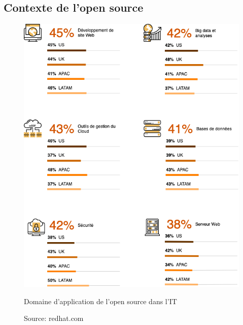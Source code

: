 \begin{appendices}
\chapter{Contexte de l'open source}

\begin{figure}[h]
	\center
	\includegraphics[scale=0.65]{./img/Domain_os.png}
	\caption{Domaine d'application de l'open source dans l'IT}							
	\caption*{\color{silver}Source: redhat.com}					
\end{figure}


\end{appendices}
